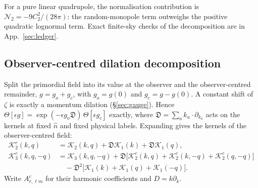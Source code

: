 \documentclass[11pt]{article}
\theoremstyle{definition}
\theoremstyle{remark}
\newcommand{\eps}{\epsilon}
\newcommand{\nh}{\hat n}
\begin{document}
For a pure linear quadrupole, the normalisation contribution is
$\mathcal N_2=-9C_2^2/(28\pi)$: the random-monopole term outweighs the positive quadratic
lognormal term. Exact finite-sky checks of the decomposition are in App.~\ref{sec:ledger}.

\subsection{Observer-centred dilation decomposition}\label{sec:obs-dilation}
Split the primordial field into its value at the observer and the observer-centred remainder,
$g=g_o+g_c$, with $g_o=g(0)$ and $g_c=g-g(0)$. A constant shift of $\zeta$ is exactly a
momentum dilation (\S\ref{sec:gauge}). Hence $\Theta[\eps g]=\exp(-\eps g_o\mathfrak D)\,\Theta[\eps g_c]$
exactly, where $\mathfrak D=\sum_ak_a\cdot\partial_{k_a}$ acts on the kernels at fixed $\nh$ and
fixed physical labels. Expanding gives the kernels of the observer-centred field:
\begin{align*}
\mathcal K^c_2(k,q)&=\mathcal K_2(k,q)+\mathfrak D\mathcal K_1(k)+\mathfrak D\mathcal K_1(q),\\
\mathcal K^c_3(k,q,-q)&=\mathcal K_3(k,q,-q)+\mathfrak D\big[\mathcal K^c_2(k,q)+\mathcal K^c_2(k,-q)+\mathcal K^c_2(q,-q)\big]\\
&\quad-\mathfrak D^2\big[\mathcal K_1(k)+\mathcal K_1(q)+\mathcal K_1(-q)\big].
\end{align*}
Write $A^c_{r,\ell m}$ for their harmonic coefficients and $D=k\partial_k$.
\end{document}

